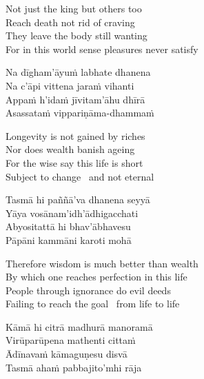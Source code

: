 \begin{english-verses}
  Not just the king but others too\\
  Reach death not rid of craving\\
  They leave the body still wanting\\
  For in this world sense pleasures never satisfy
\end{english-verses}

\ifninebythirteen\clearpage\fi
\ifafive\clearpage\fi

\begin{verses}
  Na dīgham'āyuṁ labhate dhanena\\
  Na c'āpi vittena jaraṁ vihanti\\
  Appaṁ h'idaṁ jīvitam'āhu dhīrā\\
  Asassataṁ vippariṇāma-dhammaṁ
\end{verses}

\begin{english-verses}
  Longevity is not gained by riches\\
  Nor does wealth banish ageing\\
  For the wise say this life is short\\
  Subject to change \breathmark\ and not eternal
\end{english-verses}

\begin{verses}
  Tasmā hi paññā'va dhanena seyyā\\
  Yāya vosānam'idh'ādhigacchati\\
  Abyositattā hi bhav'ābhavesu\\
  Pāpāni kammāni karoti mohā
\end{verses}

\begin{english-verses}
  Therefore wisdom is much better than wealth\\
  By which one reaches perfection in this life\\
  People through ignorance do evil deeds\\
  Failing to reach the goal \breathmark\ from life to life
\end{english-verses}

\ifbfive\clearpage\fi
\ifninebythirteen\clearpage\fi

\begin{verses}
  Kāmā hi citrā madhurā manoramā\\
  Virūparūpena mathenti cittaṁ\\
  Ādīnavaṁ kāmaguṇesu disvā\\
  Tasmā ahaṁ pabbajito'mhi rāja
\end{verses}

